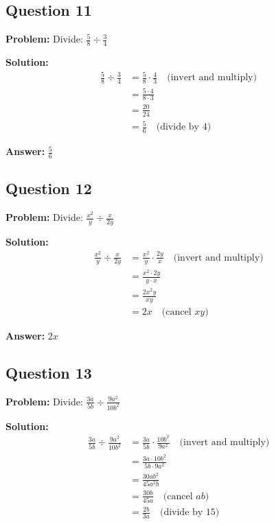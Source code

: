 \documentclass[12pt]{article}
\begin{document}
\subsection*{Question 11}
\textbf{Problem:} Divide: $\frac{5}{8} \div \frac{3}{4}$

\textbf{Solution:}
\begin{align*}
\frac{5}{8} \div \frac{3}{4} &= \frac{5}{8} \cdot \frac{4}{3} \quad \text{(invert and multiply)} \\
&= \frac{5 \cdot 4}{8 \cdot 3} \\
&= \frac{20}{24} \\
&= \frac{5}{6} \quad \text{(divide by 4)}
\end{align*}

\textbf{Answer:} $\boxed{\frac{5}{6}}$

\subsection*{Question 12}
\textbf{Problem:} Divide: $\frac{x^2}{y} \div \frac{x}{2y}$

\textbf{Solution:}
\begin{align*}
\frac{x^2}{y} \div \frac{x}{2y} &= \frac{x^2}{y} \cdot \frac{2y}{x} \quad \text{(invert and multiply)} \\
&= \frac{x^2 \cdot 2y}{y \cdot x} \\
&= \frac{2x^2y}{xy} \\
&= 2x \quad \text{(cancel } xy \text{)}
\end{align*}

\textbf{Answer:} $\boxed{2x}$

\subsection*{Question 13}
\textbf{Problem:} Divide: $\frac{3a}{5b} \div \frac{9a^2}{10b^2}$

\textbf{Solution:}
\begin{align*}
\frac{3a}{5b} \div \frac{9a^2}{10b^2} &= \frac{3a}{5b} \cdot \frac{10b^2}{9a^2} \quad \text{(invert and multiply)} \\
&= \frac{3a \cdot 10b^2}{5b \cdot 9a^2} \\
&= \frac{30ab^2}{45a^2b} \\
&= \frac{30b}{45a} \quad \text{(cancel } ab \text{)} \\
&= \frac{2b}{3a} \quad \text{(divide by 15)}
\end{align*}
\end{document}
